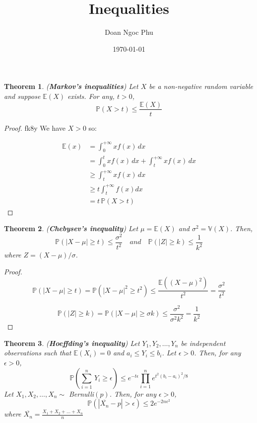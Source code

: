 \documentclass[12pt, letterpaper, twoside]{article}
\title{Inequalities}
\author{Doan Ngoc Phu}
\date{\today}
\newtheorem{theorem}{Theorem}
\begin{document}
\begin{titlepage}
\maketitle
\end{titlepage}

\begin{theorem}(\textbf{Markov's inequalities})
Let $X$ be a non-negative random variable and suppose $\mathbb{E}(X)$ exists. For any, $t > 0$,
\[
\mathbb{P}(X > t) \leq \frac{\mathbb{E}(X)}{t}
\]
\end{theorem}

\begin{proof}fk8y
We have $X > 0$ so: 

\begin{align*}
\mathbb{E}(x) &= \int_0^{+\infty}xf(x) \, dx \\
 &= \int_0^{t}xf(x) \, dx + \int_t^{+\infty} xf(x)\, dx \\
 &\geq \int_t^{+\infty} xf(x)\, dx \\
 &\geq t\int_t^{+\infty} f(x)dx \\
 &= t\,\mathbb{P}(X > t)
\end{align*}

\end{proof}

\begin{theorem}(\textbf{Chebysev's inequality})
Let $\mu = \mathbb{E}(X)$ and $\sigma^2 = \mathbb{V}(X)$. Then,
\[
\mathbb{P}(|X-\mu| \geq t)\leq \frac{\sigma^2}{t^2}\quad \textit{and} \quad \mathbb{P}(|Z| \geq k) \leq \frac{1}{k^2}
\]
where $Z = (X-\mu)/\sigma $.
\end{theorem}

\begin{proof}
\[\mathbb{P}(|X-\mu|\geq t) = \mathbb{P}(|X-\mu|^2 \geq t^2) \leq \frac{\mathbb{E}((X-\mu)^2)}{t^2} = \frac{\sigma^2}{t^2}\]

\[\mathbb{P}(|Z|\geq k) = \mathbb{P}(|X-\mu| \geq \sigma k) \leq \frac{\sigma^2}{\sigma^2k^2}=\frac{1}{k^2}\]
\end{proof}

\begin{theorem}(\textbf{Hoeffding's inequality})
Let $Y_1, Y_2, \hdots, Y_n$ be independent observations such that $\mathbb{E}(X_i) = 0$ and $a_i \leq Y_i \leq b_i$. Let $\epsilon > 0$. Then, for any $\epsilon > 0$,
\[
\mathbb{P}(\sum_{i=1}^n\, Y_i \geq \epsilon) \leq e^{-t\epsilon}\prod_{i=1}^ne^{t^2(b_i-a_i)^2/8}
\]
Let $X_1, X_2, \hdots, X_n \sim$ Bernulli$(p)$. Then, for any $\epsilon > 0$,
\[
\mathbb{P}(|\overline{X_n}-p| > \epsilon) \leq 2e^{-2n\epsilon^2}
\] 
where $\overline{X_n} = \frac{X_1 + X_2 + \hdots + X_n}{n}$
\end{theorem}
\end{document}
